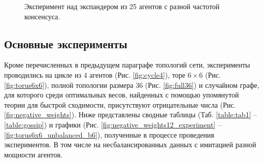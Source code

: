 \documentclass[a4paper,article,14pt]{extarticle}
\begin{document}
\begin{figure}[H]
\begin{center}
\caption{ \label{fig:expander25experiment}
     Эксперимент над экспандером из 25 агентов с разной частотой консенсуса.}
\end{center}
\end{figure}


\subsection{Основные эксперименты}
\label{section:main_experiments}

Кроме перечисленных в предыдущем параграфе топологий сети, эксперименты проводились на цикле из 4 агентов (Рис. \ref{fig:cycle4}), торе $6\times 6$ (Рис. \ref{fig:torus6x6}), полной топологии размера 36 (Рис. \ref{fig:full36}) и случайном графе, для которого среди оптимальных весов, найденных с помощью упомянутой теории для быстрой сходимости, присутствуют отрицательные числа (Рис. \ref{fig:negative_weights}).
Ниже представлены сводные таблицы (Таб. \ref{table:tab1} -- \ref{table:gossip}) и графики (Рис. \ref{fig:negative_weights12_experiment} -- \ref{fig:torus6x6_unbalanced_b6}), полученные в процессе проведения экспериментов. В том числе на несбалансированных данных с имитацией разной мощности агентов.
\end{document}
